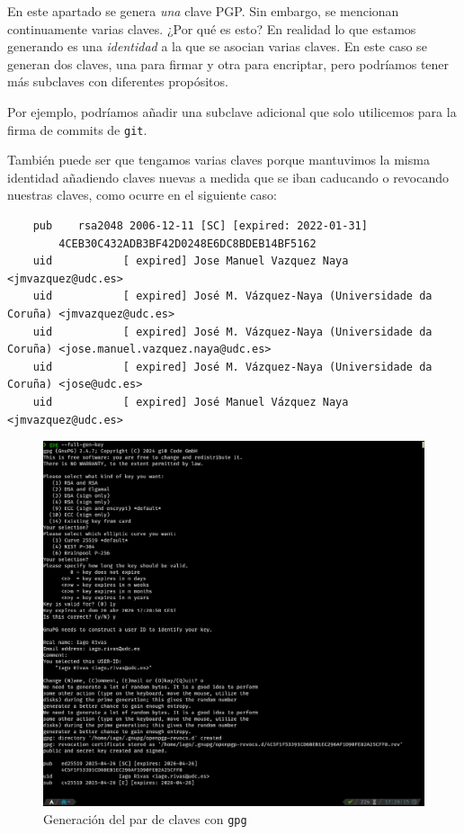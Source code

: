 \begin{tcolorbox}[
    colback=orange!5!white,
    colframe=orange!75!black,
    title=Puntualización
]
    En este apartado se genera \textit{una} clave PGP. Sin embargo, se mencionan continuamente varias claves. ¿Por qué es esto?
    \tcblower
    En realidad lo que estamos generando es una \textit{identidad} a la que se asocian varias claves. En este caso se generan dos claves, una para firmar y otra para encriptar, pero podríamos tener más subclaves con diferentes propósitos.

    Por ejemplo, podríamos añadir una subclave adicional que solo utilicemos para la firma de commits de \texttt{git}.

    También puede ser que tengamos varias claves porque mantuvimos la misma identidad añadiendo claves nuevas a medida que se iban caducando o revocando nuestras claves, como ocurre en el siguiente caso:

    \begin{verbatim}
    pub    rsa2048 2006-12-11 [SC] [expired: 2022-01-31]
        4CEB30C432ADB3BF42D0248E6DC8BDEB14BF5162
    uid           [ expired] Jose Manuel Vazquez Naya <jmvazquez@udc.es>
    uid           [ expired] José M. Vázquez-Naya (Universidade da Coruña) <jmvazquez@udc.es>
    uid           [ expired] José M. Vázquez-Naya (Universidade da Coruña) <jose.manuel.vazquez.naya@udc.es>
    uid           [ expired] José M. Vázquez-Naya (Universidade da Coruña) <jose@udc.es>
    uid           [ expired] José Manuel Vázquez Naya <jmvazquez@udc.es>
    \end{verbatim}
\end{tcolorbox}

\begin{figure}[H]
    \centering
    \includegraphics[width=\textwidth]{gpg-genkey.png}
    \caption{Generación del par de claves con \texttt{gpg}}
    \label{fig:generacion-claves}
\end{figure}

